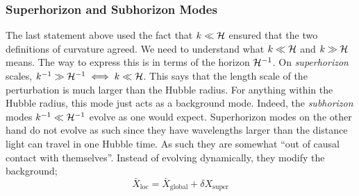 \subsubsection{Superhorizon and Subhorizon Modes}
The last statement above used the fact that $k \ll \mathcal{H}$ ensured that the two definitions of curvature agreed. We need to understand what $k \ll \mathcal{H}$ and $k \gg \mathcal{H}$ means. The way to express this is in terms of the horizon $\mathcal{H}^{-1}$. On \emph{superhorizon} scales, $k^{-1} \gg \mathcal{H}^{-1} \iff k \ll \mathcal{H}$. This says that the length scale of the perturbation is much larger than the Hubble radius. For anything within the Hubble radius, this mode just acts as a background mode. Indeed, the \emph{subhorizon} modes $k^{-1} \ll \mathcal{H}^{-1}$ evolve as one would expect. Superhorizon modes on the other hand do not evolve as such since they have wavelengths larger than the distance light can travel in one Hubble time. As such they are somewhat ``out of causal contact with themselves''. Instead of evolving dynamically, they modify the background;
\begin{equation*}
\bar{X}_{\text{loc}} = \bar{X}_{\text{global}} + \delta X_{\text{super}}
\end{equation*}
